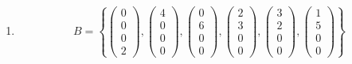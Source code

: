 \documentclass[a4paper]{scrartcl}
\begin{document}
\begin{enumerate}
\begin{proof}
\begin{enumerate}
            \end{enumerate}
        \end{proof}

    \item
        \begin{equation}
            B = \left\{
                \begin{pmatrix}
                    0 \\ 0 \\ 0 \\ 2
                \end{pmatrix}
                ,
                \begin{pmatrix}
                    4 \\ 0 \\ 0 \\ 0
                \end{pmatrix}
                ,
                \begin{pmatrix}
                    0 \\ 6 \\ 0 \\ 0
                \end{pmatrix}
                ,
                \begin{pmatrix}
                    2 \\ 3 \\ 0 \\ 0
                \end{pmatrix}
                ,
                \begin{pmatrix}
                    3 \\ 2 \\ 0 \\ 0
                \end{pmatrix}
                ,
                \begin{pmatrix}
                    1 \\ 5 \\ 0 \\ 0
                \end{pmatrix}
            \right\}
        \end{equation}

\end{enumerate}
\end{document}

